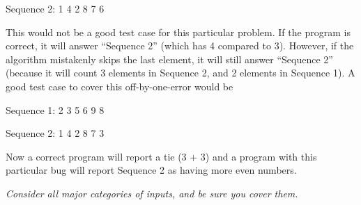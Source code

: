 \documentclass[11pt, a4paper]{article}
\begin{document}
Sequence 2: 1 4 2 8 7 6

This would not be a good test case for this particular problem. If the program is correct, it will answer “Sequence 2” (which has 4 compared to 3). However, if the algorithm mistakenly skips the last element, it will still answer “Sequence 2” (because it will count 3 elements in Sequence 2, and 2 elements in Sequence 1). A good test case to cover this off-by-one-error would be

Sequence 1: 2 3 5 6 9 8

Sequence 2: 1 4 2 8 7 3

Now a correct program will report a tie (3 + 3) and a program with this particular bug will report Sequence 2 as having more even numbers.

\textit{Consider all major categories of inputs, and be sure you cover them.}
\end{document}
